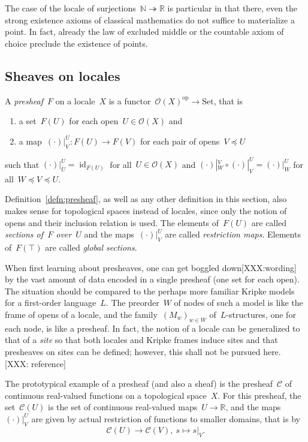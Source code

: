 \documentclass{ws-rv9x6}
\newcommand{\C}{\mathcal{C}}
\renewcommand{\O}{\mathcal{O}}
\newcommand{\NN}{\mathbb{N}}
\newcommand{\RR}{\mathbb{R}}
\newcommand{\op}{\mathrm{op}}
\newcommand{\Set}{\mathrm{Set}}
\renewcommand{\_}{\mathpunct{.}}
\newcommand{\?}{\,{:}\,}
\begin{document}
\begin{remark}The case of the locale of surjections~$\NN \twoheadrightarrow
\RR$ is particular in that there, even the strong existence axioms of
classical mathematics do not suffice to materialize a point. In fact, already
the law of excluded middle or the countable axiom of choice preclude the
existence of points.
\end{remark}


\subsection{Sheaves on locales}

\begin{definition}\label{defn:presheaf}
A \emph{presheaf}~$F$ on a locale~$X$ is a functor~$\O(X)^\op \to \Set$, that is
\begin{enumerate}
  \item a set~$F(U)$ for each open~$U \in \O(X)$ and
  \item a map~$(\cdot)|^U_V : F(U) \to F(V)$ for each pair of opens~$V \preceq U$
\end{enumerate}
such that $(\cdot)|^U_U = \operatorname{id}_{F(U)}$ for all~$U \in \O(X)$ and
$(\cdot)|^V_W \circ (\cdot)|^U_V = (\cdot)|^U_W$ for all~$W \preceq V
\preceq U$.\end{definition}

Definition~\ref{defn:presheaf}, as well as any other definition in this section,
also makes sense for topological spaces instead of locales, since only the
notion of opens and their inclusion relation is used. The elements of~$F(U)$ are
called \emph{sections of~$F$ over~$U$} and the maps~$(\cdot)|^U_V$
are called \emph{restriction maps}. Elements of~$F(\top)$ are called
\emph{global sections}.

When first learning about presheaves, one can get boggled down[XXX:wording] by the vast
amount of data encoded in a single presheaf (one set for each open). The
situation should be compared to the perhaps more familiar Kripke models for a first-order language~$L$. The
preorder~$W$ of nodes of such a model is like the frame of opens of a locale, and the
family~$(M_w)_{w \in W}$ of~$L$-structures, one for each node, is like a
presheaf. In fact, the notion of a locale can be generalized to that of a
\emph{site} so that both locales and Kripke frames induce sites and that
presheaves on sites can be defined; however, this shall not be pursued here.
[XXX: reference]

The prototypical example of a presheaf (and also a sheaf) is the presheaf~$\C$ of
continuous real-valued functions on a topological space~$X$. For this presheaf, the
set~$\C(U)$ is the set of continuous real-valued maps~$U \to \RR$, and the
maps~$(\cdot)|^U_V$ are given by actual restriction of functions to smaller
domains, that is by
\[ \C(U) \longrightarrow \C(V),\ s \longmapsto s|_V. \]
\end{document}
